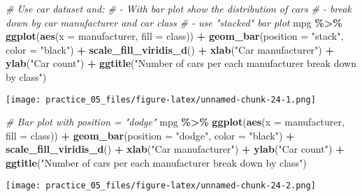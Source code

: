 \documentclass[
]{article}
\newenvironment{Shaded}{\begin{snugshade}}{\end{snugshade}}
\newcommand{\AttributeTok}[1]{\textcolor[rgb]{0.13,0.29,0.53}{#1}}
\newcommand{\CommentTok}[1]{\textcolor[rgb]{0.56,0.35,0.01}{\textit{#1}}}
\newcommand{\FunctionTok}[1]{\textcolor[rgb]{0.13,0.29,0.53}{\textbf{#1}}}
\newcommand{\NormalTok}[1]{#1}
\newcommand{\SpecialCharTok}[1]{\textcolor[rgb]{0.81,0.36,0.00}{\textbf{#1}}}
\newcommand{\StringTok}[1]{\textcolor[rgb]{0.31,0.60,0.02}{#1}}
\begin{document}
\begin{Shaded}
\begin{Highlighting}[]
\CommentTok{\# Use car dataset and:}
\CommentTok{\#  {-} With bar plot show the distribution of cars}
\CommentTok{\#  {-} break down by car manufacturer and car class}
\CommentTok{\#  {-} use "stacked" bar plot}
\NormalTok{mpg }\SpecialCharTok{\%\textgreater{}\%} 
  \FunctionTok{ggplot}\NormalTok{(}\FunctionTok{aes}\NormalTok{(}\AttributeTok{x =}\NormalTok{ manufacturer,}
             \AttributeTok{fill =}\NormalTok{ class)) }\SpecialCharTok{+}
  \FunctionTok{geom\_bar}\NormalTok{(}\AttributeTok{position =} \StringTok{"stack"}\NormalTok{,}
           \AttributeTok{color =} \StringTok{"black"}\NormalTok{) }\SpecialCharTok{+}  
  \FunctionTok{scale\_fill\_viridis\_d}\NormalTok{() }\SpecialCharTok{+}
  \FunctionTok{xlab}\NormalTok{(}\StringTok{"Car manufacturer"}\NormalTok{) }\SpecialCharTok{+}
  \FunctionTok{ylab}\NormalTok{(}\StringTok{"Car count"}\NormalTok{) }\SpecialCharTok{+}
  \FunctionTok{ggtitle}\NormalTok{(}\StringTok{"Number of cars per each manufacturer break down by class"}\NormalTok{)}
\end{Highlighting}
\end{Shaded}

\texttt{[image: practice\_05\_files/figure-latex/unnamed-chunk-24-1.png]}

\begin{Shaded}
\begin{Highlighting}[]
\CommentTok{\# Bar plot with position = "dodge"}
\NormalTok{mpg }\SpecialCharTok{\%\textgreater{}\%} 
  \FunctionTok{ggplot}\NormalTok{(}\FunctionTok{aes}\NormalTok{(}\AttributeTok{x =}\NormalTok{ manufacturer,}
             \AttributeTok{fill =}\NormalTok{ class)) }\SpecialCharTok{+}
  \FunctionTok{geom\_bar}\NormalTok{(}\AttributeTok{position =} \StringTok{"dodge"}\NormalTok{,}
           \AttributeTok{color =} \StringTok{"black"}\NormalTok{) }\SpecialCharTok{+}  
  \FunctionTok{scale\_fill\_viridis\_d}\NormalTok{() }\SpecialCharTok{+}
  \FunctionTok{xlab}\NormalTok{(}\StringTok{"Car manufacturer"}\NormalTok{) }\SpecialCharTok{+}
  \FunctionTok{ylab}\NormalTok{(}\StringTok{"Car count"}\NormalTok{) }\SpecialCharTok{+}
  \FunctionTok{ggtitle}\NormalTok{(}\StringTok{"Number of cars per each manufacturer break down by class"}\NormalTok{)}
\end{Highlighting}
\end{Shaded}

\texttt{[image: practice\_05\_files/figure-latex/unnamed-chunk-24-2.png]}
\end{document}
